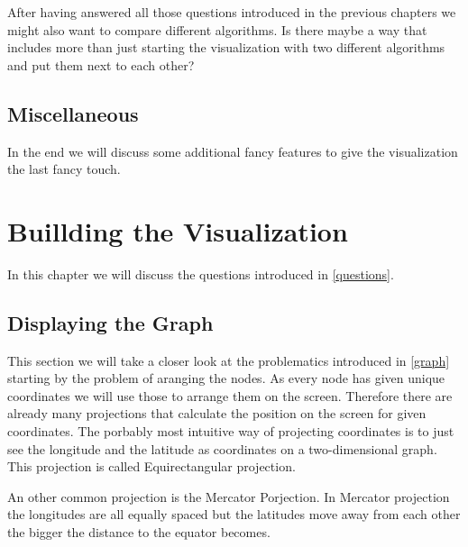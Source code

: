 \documentclass
[
	paper = a4,
    pagesize,
	12 pt,
	oneside,                       %
    open = right,
	DIV = calc,
	BCOR = 0 mm,                   %
	bibtotoc
]
{scrbook}
\begin{document}
After having answered all those questions introduced in the previous chapters we might also want to compare different algorithms. Is there maybe a way that includes more than just starting the visualization with two different algorithms and put them next to each other?



\section{Miscellaneous}


In the end we will discuss some additional fancy features to give the visualization the last fancy touch.



\chapter{Buillding the Visualization}

In this chapter we will discuss the questions introduced in \ref{questions}.


\section{Displaying the Graph}

This section we will take a closer look at the problematics introduced in \ref{graph} starting by the problem of aranging the nodes.
As every node has given unique coordinates we will use those to arrange them on the screen.
Therefore there are already many projections that calculate the position on the screen for given coordinates.
The porbably most intuitive way of projecting coordinates is to just see the longitude and the latitude as coordinates on a two-dimensional graph.
This projection is called Equirectangular projection.
\par
An other common projection is the Mercator Porjection.
In Mercator projection the longitudes are all equally spaced but the latitudes move away from each other the bigger the distance to the equator becomes.
\end{document}
